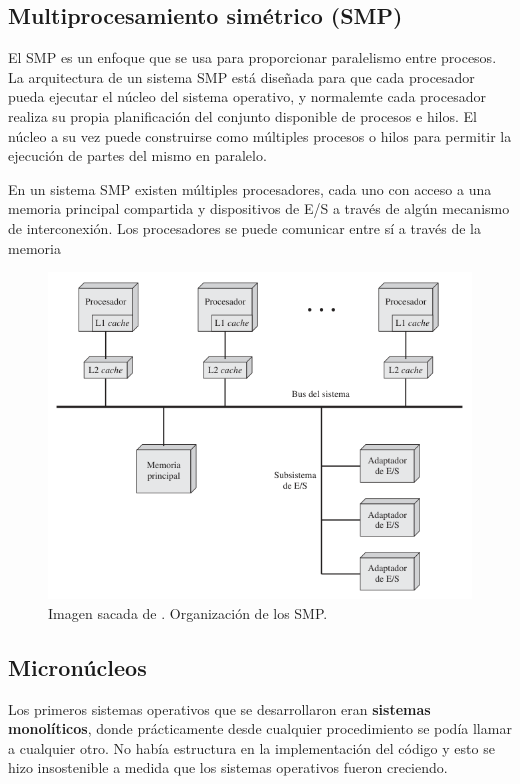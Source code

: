\documentclass[12pt]{article}
\begin{document}
  \subsection{Multiprocesamiento simétrico (SMP)}
  El SMP es un enfoque que se usa para proporcionar paralelismo entre procesos. La arquitectura de un sistema SMP está diseñada para que cada procesador pueda ejecutar el núcleo del sistema operativo, y normalemte cada procesador realiza su propia planificación del conjunto disponible de procesos e hilos. El núcleo a su vez puede construirse como múltiples procesos o hilos para permitir la ejecución de partes del mismo en paralelo.

  En un sistema SMP existen múltiples procesadores, cada uno con acceso a una memoria principal compartida y dispositivos de E/S a través de algún mecanismo de interconexión. Los procesadores se puede comunicar entre sí a través de la memoria

  \begin{figure}[H]
    \centering
    \includegraphics[width=0.8\linewidth]{imagenes/organizacion-smp.png}
    \caption{Imagen sacada de \parencite{sostallings}. Organización de los SMP.}
    \label{fig:organizacion-smp}
  \end{figure}

  \subsection{Micronúcleos}
  Los primeros sistemas operativos que se desarrollaron eran \textbf{sistemas monolíticos}, donde prácticamente desde cualquier procedimiento se podía llamar a cualquier otro. No había estructura en la implementación del código y esto se hizo insostenible a medida que los sistemas operativos fueron creciendo. 
\end{document}
